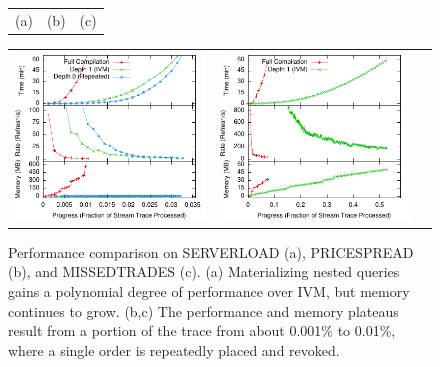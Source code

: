 \begin{figure}
\begin{center}
\begin{minipage}{\textwidth}
\begin{center}
\begin{tabular}{ccc}
(a) & (b) & (c)
\end{tabular}
\caption{Performance comparison on SERVERLOAD (a), PRICESPREAD (b), and MISSEDTRADES (c).  (a) Materializing nested queries gains a polynomial degree of performance over IVM, but memory continues to grow.  (b,c) The performance and memory plateaus result from a portion of the trace from about 0.001\% to 0.01\%, where a single order is repeatedly placed and revoked.}
\label{fig:experiments:serverload}
\label{fig:experiments:pricespread}
\label{fig:experiments:missedtrades}
\end{center}
\end{minipage}

\vspace*{0.1in}

\begin{minipage}{\textwidth}
\begin{center}
\begin{tabular}{ccc}
\includegraphics[width=\figurewidth]{../graphs/graphs/unified_tpch18.pdf} &
\includegraphics[width=\figurewidth]{../graphs/graphs/unified_axfinder.pdf} &

\end{tabular}
\end{center}
\end{minipage}
\end{center}
\end{figure}
